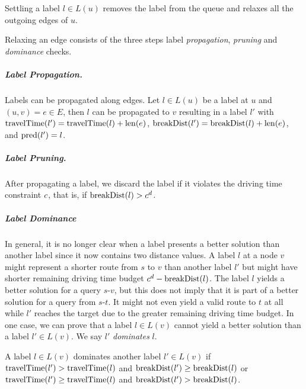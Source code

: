 \begin{algorithm}[hbtp]
	\DontPrintSemicolon


	\caption[\textsc{SettleNextLabel}]{\label{alg:settle_next_label}Settling a label $l \in L(u)$ removes the label from the queue and relaxes all the outgoing edges of $u$.}
\end{algorithm}


Relaxing an edge consists of the three steps label \emph{propagation}, \emph{pruning} and \emph{dominance} checks.

\subparagraph{Label Propagation.}
Labels can be propagated along edges. Let $l \in L(u)$ be a label at $u$ and $(u,v) = e \in E$, then $l$ can be propagated to $v$ resulting in a label $l'$ with $\operatorname{travelTime}(l') = \operatorname{travelTime}(l) + \operatorname{len}(e)$, $\operatorname{breakDist}(l') = \operatorname{breakDist}(l) + \operatorname{len}(e)$, and $\operatorname{pred}(l') = l$.

\subparagraph{Label Pruning.}
After propagating a label, we discard the label if it violates the driving time constraint $c$, that is, if $\operatorname{breakDist}(l) > c^d$.


\subparagraph{Label Dominance}
In general, it is no longer clear when a label presents a better solution than another label since it now contains two distance values. A label $l$ at a node $v$ might represent a shorter route from $s$ to $v$ than another label $l'$ but might have shorter remaining driving time budget $c^d - \operatorname{breakDist}(l)$. The label $l$ yields a better solution for a query $s$-$v$, but this does not imply that it is part of a better solution for a query from $s$-$t$. It might not even yield a valid route to $t$ at all while $l'$ reaches the target due to the greater remaining driving time budget. In one case, we can prove that a label $l \in L(v)$ cannot yield a better solution than a label $l' \in L(v)$. We say $l'$ \emph{dominates} $l$.

\begin{definition}
	A label $l \in L(v)$ dominates another label $l' \in L(v)$ if $\operatorname{travelTime}(l') > \operatorname{travelTime}(l)$ and $\operatorname{breakDist}(l') \ge \operatorname{breakDist}(l)$ or $\operatorname{travelTime}(l') \ge \operatorname{travelTime}(l)$ and $\operatorname{breakDist}(l') > \operatorname{breakDist}(l)$.
\end{definition}

